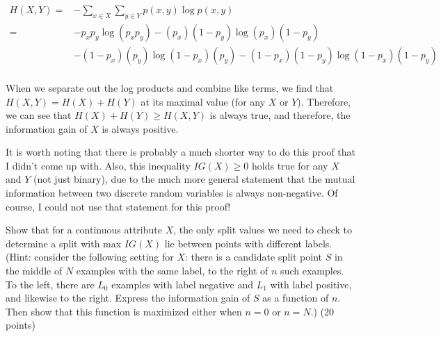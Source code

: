 \documentclass[fleqn]{homework}
\begin{document}
\begin{problem}{3}
    \begin{align*}
      H(X,Y) =& - \sum_{x \in X} \sum_{y \in Y} p(x,y) \log p(x,y) \\
             =& -p_x p_y \log (p_x p_y) - (p_x)(1-p_y) \log (p_x)(1-p_y) \\
              &- (1-p_x)(p_y) \log (1-p_x)(p_y) - (1-p_x)(1-p_y) \log (1-p_x)(1-p_y) \\
    \end{align*}

    When we separate out the log products and combine like terms, we find that
    $H(X,Y) = H(X) + H(Y)$ at its maximal value (for any $X$ or $Y$).
    Therefore, we can see that $H(X) + H(Y) \ge H(X,Y)$ is always true, and
    therefore, the information gain of $X$ is always positive.

    It is worth noting that there is probably a much shorter way to do this
    proof that I didn't come up with.  Also, this inequality $IG(X) \ge 0$ holds
    true for any $X$ and $Y$ (not just binary), due to the much more general
    statement that the mutual information between two discrete random variables
    is always non-negative.  Of course, I could not use that statement for this
    proof!
  \end{problem}

  \begin{problem}{4}
    \begin{question}
      Show that for a continuous attribute $X$, the only split values we need to
      check to determine a split with max $IG(X)$ lie between points with
      different labels.  (Hint: consider the following setting for $X$: there is
      a candidate split point $S$ in the middle of $N$ examples with the same
      label, to the right of $n$ such examples.  To the left, there are $L_0$
      examples with label negative and $L_1$ with label positive, and likewise
      to the right.  Express the information gain of $S$ as a function of $n$.
      Then show that this function is maximized either when $n=0$ or $n=N$.) (20
      points)
    \end{question}
  \end{problem}
\end{document}
